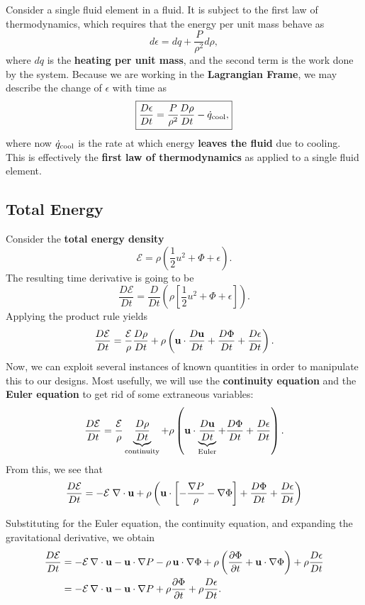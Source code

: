 Consider a single fluid element in a fluid. It is subject to the first law of thermodynamics, which requires that the energy per unit mass behave as
\[
d\epsilon = dq + \frac{P}{\rho^2} d\rho,
\]
where $dq$ is the \textbf{heating per unit mass}, and the second term is the work done by the system. Because we are working in the \textbf{Lagrangian Frame}, we may describe the change of $\epsilon$ with time as
\begin{equation}
\label{eq:lagrangian_internal_energy}
    \boxed{
    \frac{D\epsilon}{Dt} = \frac{P}{\rho^2} \frac{D\rho}{Dt} -\dot{q}_{\rm cool},
    }
\end{equation}
where now $\dot{q}_{\rm cool}$ is the rate at which energy \textbf{leaves the fluid} due to cooling. This is effectively the \textbf{first law of thermodynamics} as applied to a single fluid element.

\subsection{Total Energy}

Consider the \textbf{total energy density}
\[
\mathcal{E} = \rho\left(\frac{1}{2} u^2 + \Phi + \epsilon\right).
\]
The resulting time derivative is going to be
\[
\frac{D\mathcal{E}}{Dt} = \frac{D}{Dt}\left(\rho\left[\frac{1}{2}u^2 + \Phi + \epsilon\right]\right).
\]
Applying the product rule yields
\[
\frac{D\mathcal{E}}{Dt} = \frac{\mathcal{E}}{\rho} \frac{D\rho}{Dt} + \rho \left({\bf u} \cdot \frac{D{\bf u}}{Dt} + \frac{D\Phi}{Dt} + \frac{D\epsilon}{Dt}\right).
\]
Now, we can exploit several instances of known quantities in order to manipulate this to our designs. Most usefully, we will use the \textbf{continuity equation} and the \textbf{Euler equation} to get rid of some extraneous variables:
\[
\frac{D\mathcal{E}}{Dt} = \frac{\mathcal{E}}{\rho} \underbrace{\frac{D\rho}{Dt}}_{\text{continuity}} + \rho \left({\bf u} \cdot \underbrace{\frac{D{\bf u}}{Dt}}_{\text{Euler}} + \frac{D\Phi}{Dt} + \frac{D\epsilon}{Dt}\right).
\]
From this, we see that
\[
\frac{D\mathcal{E}}{Dt} = - \mathcal{E}\; \nabla \cdot {\bf u} + \rho\left({\bf u} \cdot \left[- \frac{\nabla P}{\rho} - \nabla \Phi\right] + \frac{D\Phi}{Dt} + \frac{D\epsilon}{Dt}\right)
\]

Substituting for the Euler equation, the continuity equation, and expanding the gravitational derivative, we obtain
\begin{align}
\frac{D\mathcal{E}}{Dt} 
&= - \mathcal{E}\,\nabla\cdot{\bf u} 
- {\bf u}\cdot\nabla P 
- \rho\,{\bf u}\cdot\nabla \Phi 
+ \rho \left(\frac{\partial \Phi}{\partial t} + {\bf u}\cdot\nabla \Phi \right) 
+ \rho \frac{D\epsilon}{Dt} \\
&= - \mathcal{E}\,\nabla\cdot{\bf u} - {\bf u}\cdot\nabla P 
+ \rho \frac{\partial \Phi}{\partial t} + \rho \frac{D\epsilon}{Dt}.
\end{align}

